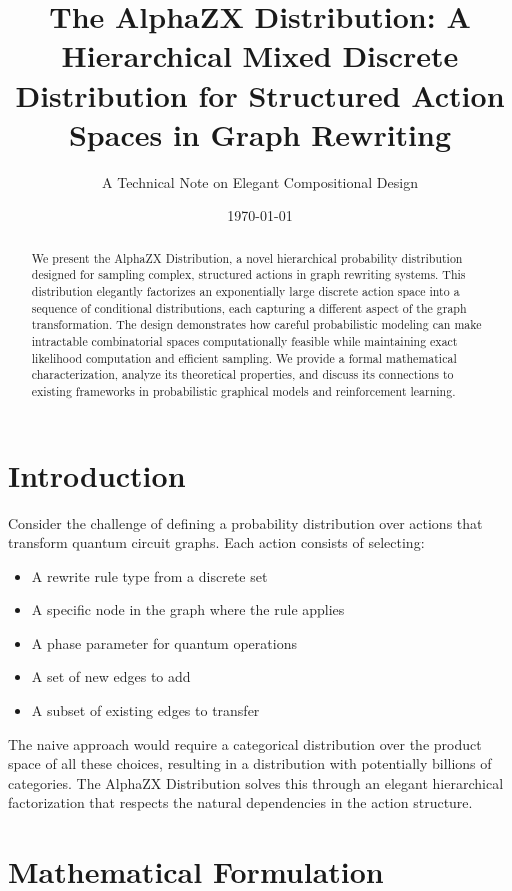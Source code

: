 \documentclass[11pt,a4paper]{article}
\title{The AlphaZX Distribution: A Hierarchical Mixed Discrete Distribution for Structured Action Spaces in Graph Rewriting}
\author{A Technical Note on Elegant Compositional Design}
\date{\today}
\begin{document}
\maketitle

\begin{abstract}
We present the AlphaZX Distribution, a novel hierarchical probability distribution designed for sampling complex, structured actions in graph rewriting systems. This distribution elegantly factorizes an exponentially large discrete action space into a sequence of conditional distributions, each capturing a different aspect of the graph transformation. The design demonstrates how careful probabilistic modeling can make intractable combinatorial spaces computationally feasible while maintaining exact likelihood computation and efficient sampling. We provide a formal mathematical characterization, analyze its theoretical properties, and discuss its connections to existing frameworks in probabilistic graphical models and reinforcement learning.
\end{abstract}

\section{Introduction}

Consider the challenge of defining a probability distribution over actions that transform quantum circuit graphs. Each action consists of selecting:
\begin{itemize}
    \item A rewrite rule type from a discrete set
    \item A specific node in the graph where the rule applies
    \item A phase parameter for quantum operations
    \item A set of new edges to add
    \item A subset of existing edges to transfer
\end{itemize}

The naive approach would require a categorical distribution over the product space of all these choices, resulting in a distribution with potentially billions of categories. The AlphaZX Distribution solves this through an elegant hierarchical factorization that respects the natural dependencies in the action structure.

\section{Mathematical Formulation}
\end{document}
